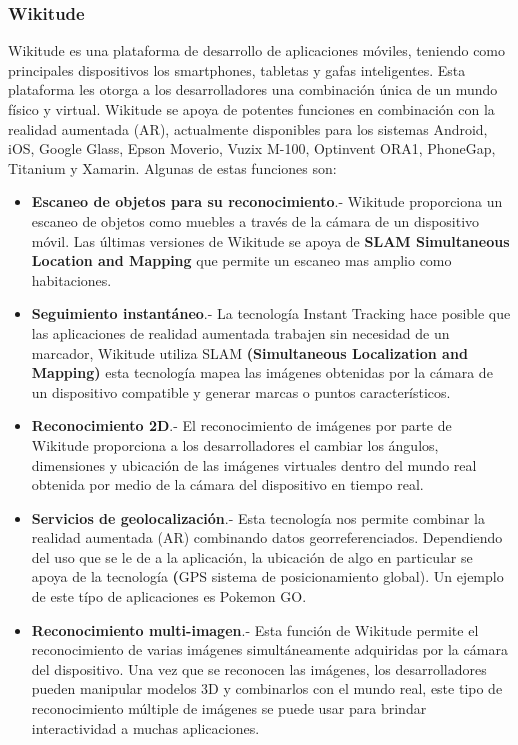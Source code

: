 \subsubsection{Wikitude}
Wikitude es una plataforma de desarrollo de aplicaciones móviles, teniendo como principales dispositivos los smartphones, tabletas y gafas inteligentes. Esta plataforma les otorga a los desarrolladores una combinación única de un mundo físico y virtual. Wikitude se apoya de potentes funciones en combinación con la realidad aumentada (AR), actualmente disponibles para los sistemas Android, iOS, Google Glass, Epson Moverio, Vuzix M-100, Optinvent ORA1, PhoneGap, Titanium y Xamarin. Algunas de estas funciones son:\cite{B09}
\begin{itemize}
	\item \textbf{Escaneo de objetos para su reconocimiento}.- Wikitude proporciona un escaneo de objetos como muebles a través de la cámara de un dispositivo móvil. Las últimas versiones de Wikitude se apoya de \textbf{SLAM Simultaneous Location  and Mapping} que permite un escaneo mas amplio como habitaciones. 
	
	\item \textbf{Seguimiento instantáneo}.- La tecnología Instant Tracking hace posible que las aplicaciones de realidad aumentada trabajen sin necesidad de un marcador, Wikitude utiliza SLAM \textbf{(Simultaneous Localization and Mapping) }esta tecnología mapea las imágenes obtenidas por la cámara de un dispositivo compatible y generar marcas o puntos característicos.
	
	\item \textbf{Reconocimiento 2D}.- El reconocimiento de imágenes por parte de Wikitude proporciona a los desarrolladores el cambiar los ángulos, dimensiones y ubicación de las imágenes virtuales dentro del mundo real obtenida por medio de la cámara del dispositivo en tiempo real.
	
	\item \textbf{Servicios de geolocalización}.- Esta tecnología nos permite combinar la realidad aumentada (AR) combinando datos georreferenciados. Dependiendo del uso que se le de a la aplicación, la ubicación de algo en particular se apoya de la tecnología \textbf(GPS sistema de posicionamiento global). Un ejemplo de este típo de aplicaciones es Pokemon GO. 
	
	\item \textbf{Reconocimiento multi-imagen}.- Esta función de Wikitude permite el reconocimiento de varias imágenes simultáneamente adquiridas por la cámara del dispositivo. Una vez que se reconocen las imágenes, los desarrolladores pueden manipular modelos 3D y combinarlos con el mundo real, este tipo de reconocimiento múltiple de imágenes se puede usar para brindar interactividad a muchas aplicaciones.
	

\end{itemize}
